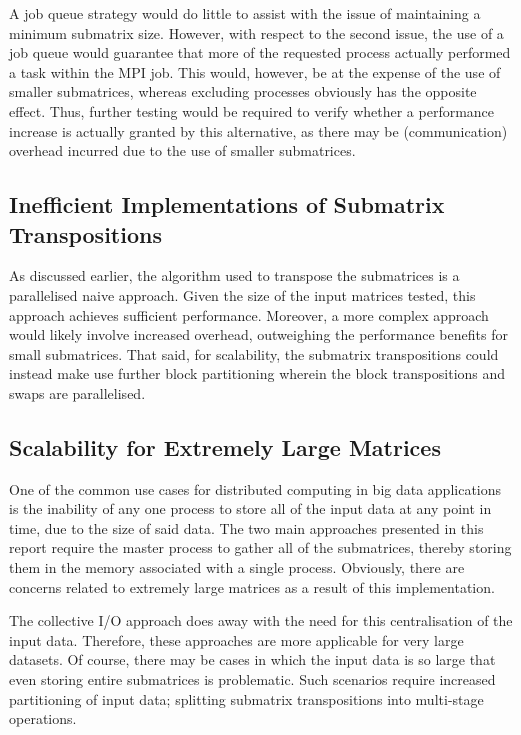 \documentclass[journal,10pt,a4paper]{IEEEtran}
\begin{document}
A job queue strategy would do little to assist with the issue of maintaining a minimum submatrix size. However, with respect to the second issue, the use of a job queue would guarantee that more of the requested process actually performed a task within the MPI job. This would, however, be at the expense of the use of smaller submatrices, whereas excluding processes obviously has the opposite effect. Thus, further testing would be required to verify whether a performance increase is actually granted by this alternative, as there may be (communication) overhead incurred due to the use of smaller submatrices.


\vspace*{-0.3 cm}

\subsection{Inefficient Implementations of Submatrix Transpositions}

As discussed earlier, the algorithm used to transpose the submatrices is a parallelised naive approach. Given the size of the input matrices tested, this approach achieves sufficient performance. Moreover, a more complex approach would likely involve increased overhead, outweighing the performance benefits for small submatrices. That said, for scalability, the submatrix transpositions could instead make use further block partitioning wherein the block transpositions and swaps are parallelised.


\subsection{Scalability for Extremely Large Matrices}

One of the common use cases for distributed computing in big data applications is the inability of any one process to store all of the input data at any point in time, due to the size of said data. The two main approaches presented in this report require the master process to gather all of the submatrices, thereby storing them in the memory associated with a single process. Obviously, there are concerns related to extremely large matrices as a result of this implementation.

The collective I/O approach does away with the need for this centralisation of the input data. Therefore, these approaches are more applicable for very large datasets. Of course, there may be cases in which the input data is so large that even storing entire submatrices is problematic. Such scenarios require increased partitioning of input data; splitting submatrix transpositions into multi-stage operations.
\end{document}
